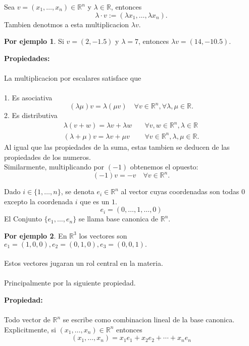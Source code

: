 \documentclass{article}
\theoremstyle{definition}
\theoremstyle{definition}
\newtheorem*{ej}{Por ejemplo}
\theoremstyle{remark}
\begin{document}
\begin{defi}
  Sea $v=(x_1,\dots,x_n) \in \mathbb{R}^n$ y $\lambda \in \mathbb{R}$, entonces \[
\lambda \cdot v := (\lambda x_1,\dots,\lambda x_n).
  \] Tambien denotmos a esta multiplicacion $\lambda v.$
\end{defi}
\begin{ej}
  Si $v=(2,-1.5)$ y $\lambda = 7$, entonces $\lambda v=(14,-10.5).$
\end{ej}
\pagebreak
\textbf{Propiedades:}\\\\
La multiplicacion por escalares satisface que \\\\
\textcolor{azulp2}{1.} Es asociativa \[
  (\lambda \mu)v=\lambda(\mu v) \quad \forall v \in \mathbb{R}^n, \forall \lambda,\mu \in \mathbb{R}.
\]
\textcolor{azulp2}{2.} Es distributiva\[
  \begin{aligned}
    \lambda(v+w)=\lambda v+\lambda w \quad &\forall v,w \in \mathbb{R}^n, \lambda \in \mathbb{R} \\
    (\lambda+\mu)v=\lambda v+\mu v \quad & \forall v \in \mathbb{R}^n, \lambda,\mu \in \mathbb{R}.
  \end{aligned}
\]
Al igual que las propiedades de la suma, estas tambien se deducen de las propiedades de los numeros.\\
Similarmente, multiplicando por $(-1)$ obtenemos el opuesto: \[
  (-1)v=-v\quad \forall v \in \mathbb{R}^n.
\]
\begin{defi}
  Dado $i \in \{1,\dots,n\}$, se denota $e_i \in \mathbb{R}^n$ al vector cuyas coordenadas son todas $0$ excepto la coordenada $i$ que es un $1$. \[
e_i=(0,\dots,1,\dots,0)
  \]
  El Conjunto $\{e_1,\dots,e_n\}$ se llama base canonica de $\mathbb{R}^n$. 
\end{defi}
\begin{ej}
  En $\mathbb{R}^3$ los vectores son $e_1=(1,0,0),e_2=(0,1,0),e_3=(0,0,1).$\\\\ Estos vectores jugaran un rol central en la materia. \\\\ Principalmente por la siguiente propiedad.
\end{ej}
\textbf{Propiedad:}\\\\
Todo vector de $\mathbb{R}^n$ se escribe como combinacion lineal de la base canonica. Explicitmente, si $(x_1,\dots,x_n) \in \mathbb{R}^n$ entonces \[
  (x_1,\dots,x_n)=x_1e_1+x_2e_2+\cdots+x_ne_n
\]
\end{document}
